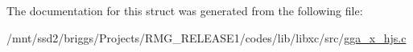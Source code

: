 The documentation for this struct was generated from the following file\-:\begin{DoxyCompactItemize}
\item 
/mnt/ssd2/briggs/\-Projects/\-R\-M\-G\-\_\-\-R\-E\-L\-E\-A\-S\-E1/codes/lib/libxc/src/\hyperlink{gga__x__hjs_8c}{gga\-\_\-x\-\_\-hjs.\-c}\end{DoxyCompactItemize}

